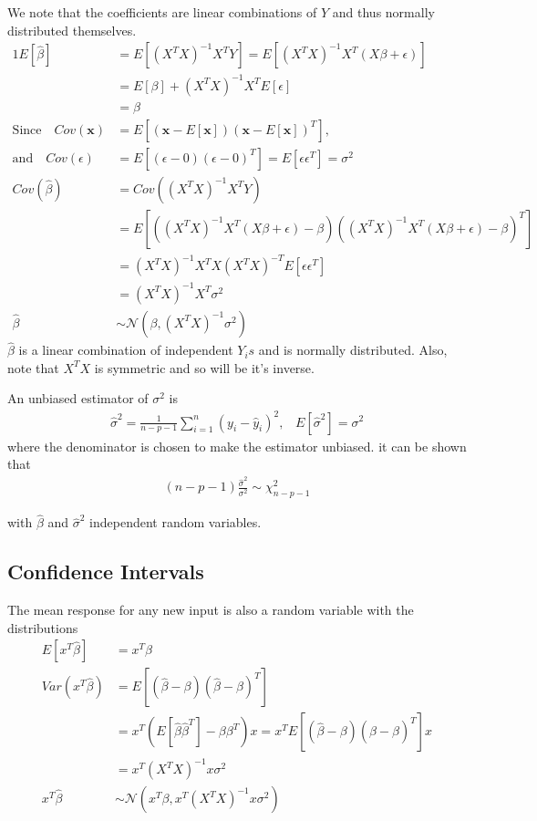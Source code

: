 \documentclass[../statistical_learning_notes.tex]{subfiles}
\begin{document}
We note that the coefficients are linear combinations of $Y$ and thus normally distributed themselves.
\begin{alignat*}{1}
    E[\hat{\beta}] &= E[(X^{T}X)^{-1}X^{T}Y] = E[(X^{T}X)^{-1}X^{T}(X\beta + \epsilon)]\\
    &= E[\beta] + (X^{T}X)^{-1}X^{T}E[\epsilon]\\
    &= \beta\\
    \text{Since} \quad Cov(\mathbf{x}) &= E[(\mathbf{x} - E[\mathbf{x}])(\mathbf{x} - E[\mathbf{x}])^{T}]\text{,}\\
    \text{and} \quad Cov(\epsilon) &= E[(\epsilon - 0)(\epsilon - 0)^{T}] = E[\epsilon \epsilon^{T}] = \sigma^{2}\\
    Cov(\hat{\beta}) &= Cov((X^{T}X)^{-1}X^{T}Y)\\ &= E[((X^{T}X)^{-1}X^{T}(X\beta + \epsilon) - \beta)((X^{T}X)^{-1}X^{T}(X\beta + \epsilon) - \beta)^{T}]\\
    &= (X^{T}X)^{-1}X^{T}X(X^{T}X)^{-T}E[\epsilon \epsilon^{T}]\\
    &= (X^{T}X)^{-1}X^{T}\sigma^{2}\\
    \hat{\beta} &\sim \mathcal{N}(\beta, (X^{T}X)^{-1}\sigma^{2})
\end{alignat*}
$\hat{\beta}$ is a linear combination of independent $Y_{i}s$ and is normally distributed. Also, note that $X^{T}X$ is symmetric and so will be it's inverse.\newline

An unbiased estimator of $\sigma^{2}$ is
\begin{align*}
    \hat{\sigma}^{2} = \frac{1}{n-p-1} \sum_{i=1}^{n} (y_{i} - \hat{y}_{i})^{2} \text{,}\quad E[\hat{\sigma}^{2}] = \sigma^{2}
\end{align*}
where the denominator is chosen to make the estimator unbiased. it can be shown that
\begin{align*}
    (n - p - 1) \frac{\hat{\sigma}^{2}}{\sigma^{2}} \sim \chi_{n-p-1}^{2}
\end{align*}

with $\hat{\beta}$ and $\hat{\sigma}^{2}$ independent random variables.


\subsection{Confidence Intervals}
The mean response for any new input is also a random variable with the distributions
\begin{align*}
    E[x^{T}\hat{\beta}] &= x^{T}\beta\\
    Var(x^{T}\hat{\beta}) &= E[(\hat{\beta} - \beta)(\hat{\beta} - \beta)^{T}]\\
    &= x^{T}(E[\hat{\beta}\hat{\beta}^{T}] - \beta\beta^{T})x = x^{T}E[(\hat{\beta} - \beta)(\hat{\beta} - \beta)^{T}]x\\
    &= x^{T}(X^{T}X)^{-1}x \sigma^{2}\\
    x^{T}\hat{\beta} &\sim \mathcal{N}(x^{T}\beta, x^{T}(X^{T}X)^{-1}x \sigma^{2})
\end{align*}
\end{document}
